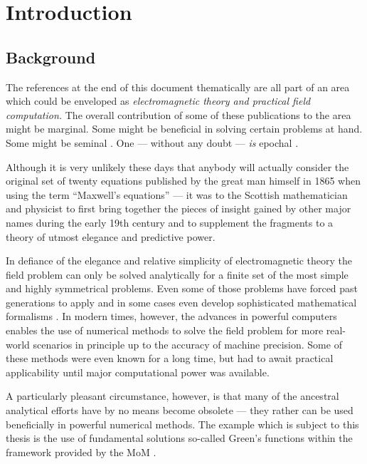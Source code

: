 \chapter{Introduction}
\label{ch:introduction}

\section{Background}

The references at the end of this document thematically are all part of an area
which could be enveloped as \emph{electromagnetic theory and practical field
computation.}
The overall contribution of some of these publications to the area might be
marginal.
Some might be beneficial in solving certain problems at hand.
Some might be seminal \cite{Sommerfeld1909}.
One --- without any doubt --- \emph{is} epochal
\cite{maxwell1865}.

Although it is very unlikely these days that anybody will actually consider the
original set of twenty equations published by the great man himself in 1865
\cite{maxwell1865} when using the term \enquote{Maxwell's equations} ---
it was to the Scottish mathematician and physicist to first bring together the
pieces of insight gained by other major names during the early 19th century and
to supplement the fragments to a theory of utmost elegance and predictive power.

In defiance of the elegance and relative simplicity of electromagnetic theory
the field problem can only be solved analytically for a finite set of the most
simple and highly symmetrical problems.
Even some of those problems have forced past generations to apply and in some
cases even develop sophisticated mathematical formalisms \cite{Felsen1994}.
In modern times, however, the advances in powerful computers enables the use of  
numerical methods to solve the field problem for more real-world scenarios in
principle up to the accuracy of machine precision.
Some of these methods were even known for a long time, but had to await
practical applicability until major computational power was available.

A particularly pleasant circumstance, however, is that many of the ancestral
analytical efforts have by no means become obsolete --- they rather can be used
beneficially in powerful numerical methods.
The example which is subject to this thesis is the use of fundamental solutions
\textemdash so-called Green's functions \textemdash within the framework
provided by the \ac{MoM} \cite{Harrington1993}.

